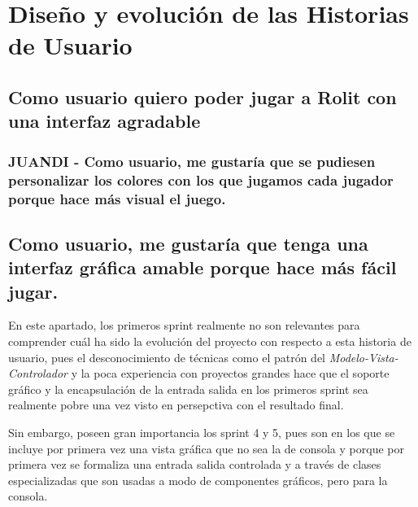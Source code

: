 \documentclass{article}
\theoremstyle{break}
\begin{document}
\section{Diseño y evolución de las Historias de Usuario}

\subsection{Como usuario quiero poder jugar a Rolit con una interfaz agradable}

\subsubsection{JUANDI - Como usuario, me gustaría que se pudiesen personalizar los colores con los que jugamos cada jugador porque hace más visual el juego.}

\subsection{Como usuario, me gustaría que tenga una interfaz gráfica amable porque hace más fácil jugar.}
En este apartado, los primeros sprint realmente no son relevantes para comprender cuál ha sido la evolución del proyecto con respecto a esta historia de usuario, pues el desconocimiento de técnicas como el patrón del \textit{Modelo-Vista-Controlador} y la poca experiencia con proyectos grandes hace que el soporte gráfico y la encapsulación de la entrada salida en los primeros sprint sea realmente pobre una vez visto en persepctiva con el resultado final.

Sin embargo, poseen gran importancia los sprint 4 y 5, pues son en los que se incluye por primera vez una vista gráfica que no sea la de consola y porque por primera vez se formaliza una entrada salida controlada y a través de clases especializadas que son usadas a modo de componentes gráficos, pero para la consola.
\end{document}
